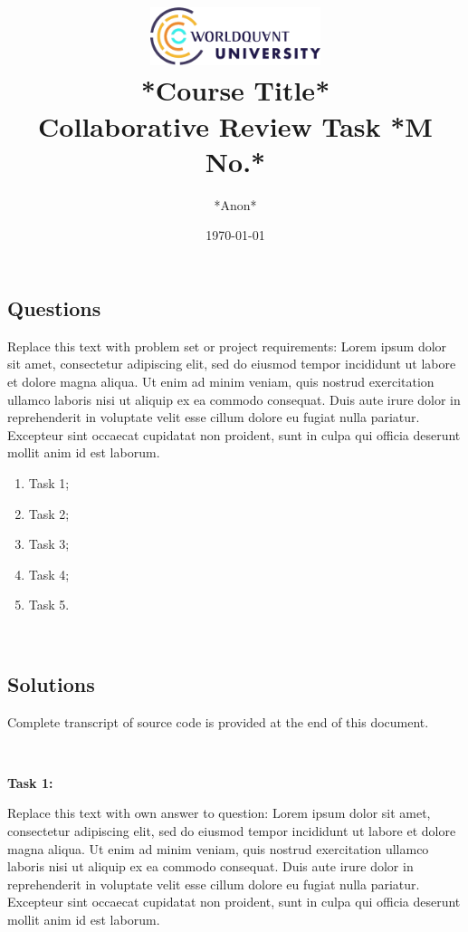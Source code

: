 \documentclass[a4paper, 11pt]{article}
\title{
    \includegraphics[width=5cm]{wqu.png} \\ 
    \Large \vspace{0.3cm} *Course Title*  \\ 
    \vspace{0.3cm} Collaborative Review Task *M No.*
}
\author{*Anon*}  %
\date{\today}
\begin{document}
\maketitle

\footnotesize
\slshape
\subsection*{Questions}

Replace this text with problem set or project requirements: Lorem ipsum dolor sit amet, consectetur adipiscing elit, sed do eiusmod tempor incididunt ut labore et dolore magna aliqua. Ut enim ad minim veniam, quis nostrud exercitation ullamco laboris nisi ut aliquip ex ea commodo consequat. Duis aute irure dolor in reprehenderit in voluptate velit esse cillum dolore eu fugiat nulla pariatur. Excepteur sint occaecat cupidatat non proident, sunt in culpa qui officia deserunt mollit anim id est laborum.

\begin{enumerate}
    \item Task 1;
    \item Task 2;
    \item Task 3;
    \item Task 4;
    \item Task 5.
\end{enumerate}

\ 

\normalsize
\normalfont
\subsection*{Solutions}

Complete transcript of source code is provided at the end of this document.

\ 

\textbf{Task 1:}

Replace this text with own answer to question: Lorem ipsum dolor sit amet, consectetur adipiscing elit, sed do eiusmod tempor incididunt ut labore et dolore magna aliqua. Ut enim ad minim veniam, quis nostrud exercitation ullamco laboris nisi ut aliquip ex ea commodo consequat. Duis aute irure dolor in reprehenderit in voluptate velit esse cillum dolore eu fugiat nulla pariatur. Excepteur sint occaecat cupidatat non proident, sunt in culpa qui officia deserunt mollit anim id est laborum.
\end{document}
